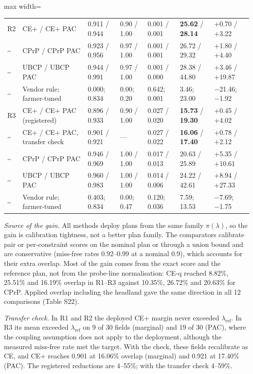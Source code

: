 \documentclass[preprint,12pt,authoryear]{elsarticle}
\begin{document}
\begin{table}[!htbp]
\begin{adjustbox}{max width=\textwidth}
\begin{tabular}{@{}l>{\raggedright\arraybackslash}p{15.1em}llll>{\raggedright\arraybackslash}p{7.3em}@{}}
R2 & CE+ / CE+ PAC & 0.911 / 0.944 & 0.90 / 1.00 & 0.001 / 0.001 & \textbf{25.62} / \textbf{28.14} & +0.70 / +3.22 \\
\textasciitilde{} & CPrP / CPrP PAC & 0.923 / 0.956 & 0.97 / 1.00 & 0.001 / 0.001 & 26.72 / 29.32 & +1.80 / +4.40 \\
\textasciitilde{} & UBCP / UBCP PAC & 0.944 / 0.991 & 0.97 / 1.00 & 0.001 / 0.000 & 28.38 / 44.80 & +3.46 / +19.87 \\
\textasciitilde{} & Vendor rule; farmer-tuned & 0.000; 0.834 & 0.00; 0.20 & 0.642; 0.001 & 3.46; 23.00 & −21.46; −1.92 \\
R3 & CE+ / CE+ PAC (registered) & 0.896 / 0.933 & 0.90 / 1.00 & 0.027 / 0.020 & \textbf{15.73} / \textbf{19.30} & +0.45 / +4.02 \\
\textasciitilde{} & CE+ / CE+ PAC, transfer check & 0.901 / 0.921 & --- & 0.027 / 0.022 & \textbf{16.06} / \textbf{17.40} & +0.78 / +2.12 \\
\textasciitilde{} & CPrP / CPrP PAC & 0.946 / 0.969 & 1.00 / 1.00 & 0.017 / 0.013 & 20.63 / 25.89 & +5.35 / +10.61 \\
\textasciitilde{} & UBCP / UBCP PAC & 0.960 / 0.983 & 1.00 / 1.00 & 0.014 / 0.006 & 24.22 / 42.61 & +8.94 / +27.33 \\
\textasciitilde{} & Vendor rule; farmer-tuned & 0.403; 0.834 & 0.00; 0.47 & 0.120; 0.036 & 7.59; 13.53 & −7.69; −1.75 \\
\bottomrule
\end{tabular}
\end{adjustbox}
\end{table}

\emph{Source of the gain.} All methods deploy plans from the same family \(\pi(\lambda)\), so the gain is calibration tightness, not a better plan family. The comparators calibrate pair or per-constraint scores on the nominal plan or through a union bound and are conservative (miss-free rates 0.92--0.99 at a nominal 0.9), which accounts for their extra overlap. Most of the gain comes from the exact score and the reference plan, not from the probe-line normalisation: CE-q reached 8.82\%, 25.51\% and 16.19\% overlap in R1--R3 against 10.35\%, 26.72\% and 20.63\% for CPrP. Applied overlap including the headland gave the same direction in all 12 comparisons (Table S22).

\emph{Transfer check.} In R1 and R2 the deployed CE+ margin never exceeded \(\lambda_\mathrm{ref}\). In R3 its mean exceeded \(\lambda_\mathrm{ref}\) on 9 of 30 fields (marginal) and 19 of 30 (PAC), where the coupling assumption does not apply to the deployment, although the measured miss-free rate met the target. With the check, these fields recalibrate as CE, and CE+ reaches 0.901 at 16.06\% overlap (marginal) and 0.921 at 17.40\% (PAC). The registered reductions are 4--55\%; with the transfer check 4--59\%.
\end{document}
